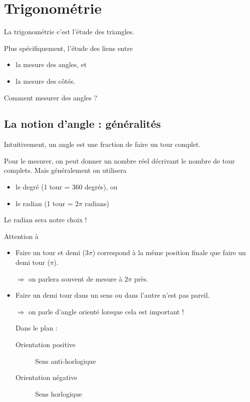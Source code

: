 \documentclass[french,xcolor=svgnames]{beamer}
\begin{document}
\section{Trigonométrie}
\begin{frame}
  La trigonométrie c'est l'étude des triangles.\pause{}

  Plus spécifiquement, l'étude des liens entre\pause{}
  \begin{itemize}
  \item la mesure des angles, et\pause{}
  \item la mesure des côtés.
  \end{itemize}\pause{}

  \begin{question}\pause{}
    Comment mesurer des angles ?
  \end{question}
\end{frame}

\subsection{La notion d'angle : généralités}
\begin{frame}
  Intuitivement, un angle est une fraction de \og faire un tour complet\fg{}.\pause{}

  Pour le mesurer\pause{}, on peut donner un nombre réel décrivant le nombre de tour complets.\pause{} Mais généralement on utilisera
  \begin{itemize}
  \item le degré\pause{} (1 tour = \(360\) degrés), ou \pause
  \item le radian\pause{} (1 tour = \(2\pi\) radians)
  \end{itemize}
  Le radian sera notre choix !\pause
\end{frame}

\begin{frame}
  \begin{block}{Attention à}
    \begin{itemize}
    \item Faire un tour et demi\pause{} (\(3\pi\)) correspond à la même position finale que faire un demi tour (\(\pi\)). \pause

      \(\Rightarrow\) on parlera souvent de mesure \og à \(2\pi\) près\fg{}.\pause
    \item Faire un demi tour dans un sens ou dans l'autre n'est pas pareil. \pause

      \(\Rightarrow\) on parle d'angle orienté lorsque cela est important !\pause

      Dans le plan :
      \begin{description}
      \item[Orientation positive] Sens anti-horlogique\pause{}
      \item[Orientation négative] Sens horlogique
      \end{description}
    \end{itemize}
  \end{block}
\end{frame}
\end{document}
